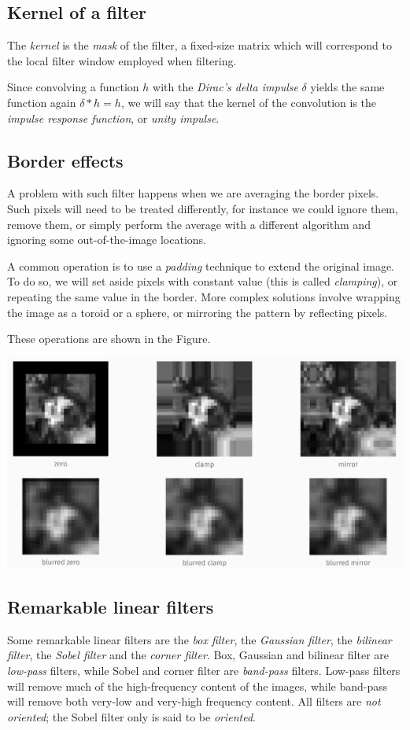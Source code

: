 \documentclass[10pt]{report}
\begin{document}
\subsection{Kernel of a filter}
\label{kernel-of-a-filter}
The \emph{kernel} is the \emph{mask} of the filter, a fixed-size matrix which will
correspond to the local filter window employed when filtering.

Since convolving a function \(h\) with the \emph{Dirac's delta impulse}
\(\delta\) yields the same function again \(\delta * h = h\), we will
say that the kernel of the convolution is the \emph{impulse response
function}, or \emph{unity impulse}.

\subsection{Border effects}
\label{border-effects}
A problem with such filter happens when we are averaging the border
pixels. Such pixels will need to be treated differently, for instance we
could ignore them, remove them, or simply perform the average with a
different algorithm and ignoring some out-of-the-image locations.

A common operation is to use a \emph{padding} technique to extend the
original image. To do so, we will set aside pixels with constant value
(this is called \emph{clamping}), or repeating the same value in the border.
More complex solutions involve wrapping the image as a toroid or a
sphere, or mirroring the pattern by reflecting pixels.

These operations are shown in the Figure.

\begin{center}
\includegraphics[width=.9\linewidth]{./pics/proc/border-effects.jpg}
\end{center}

\subsection{Remarkable linear filters}
\label{remarkable-linear-filters}
Some remarkable linear filters are the \emph{box filter}, the \emph{Gaussian
filter}, the \emph{bilinear filter}, the \emph{Sobel filter} and the \emph{corner
filter}. Box, Gaussian and bilinear filter are \emph{low-pass} filters, while
Sobel and corner filter are \emph{band-pass} filters. Low-pass filters will
remove much of the high-frequency content of the images, while band-pass
will remove both very-low and very-high frequency content. All filters
are \emph{not oriented}; the Sobel filter only is said to be \emph{oriented}.
\end{document}
